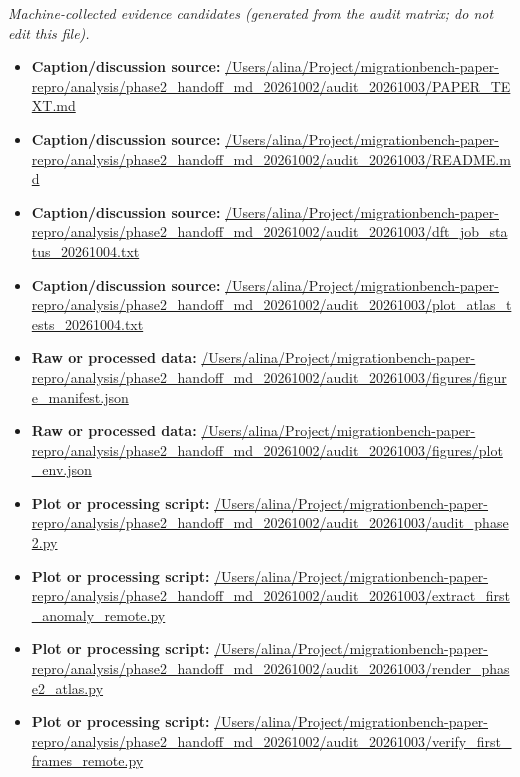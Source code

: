 \emph{Machine-collected evidence candidates (generated from the audit matrix; do not edit this file).}
\begin{itemize}[leftmargin=1.4em,noitemsep]
\item \textbf{Caption/discussion source:} \url{/Users/alina/Project/migrationbench-paper-repro/analysis/phase2_handoff_md_20261002/audit_20261003/PAPER_TEXT.md}
\item \textbf{Caption/discussion source:} \url{/Users/alina/Project/migrationbench-paper-repro/analysis/phase2_handoff_md_20261002/audit_20261003/README.md}
\item \textbf{Caption/discussion source:} \url{/Users/alina/Project/migrationbench-paper-repro/analysis/phase2_handoff_md_20261002/audit_20261003/dft_job_status_20261004.txt}
\item \textbf{Caption/discussion source:} \url{/Users/alina/Project/migrationbench-paper-repro/analysis/phase2_handoff_md_20261002/audit_20261003/plot_atlas_tests_20261004.txt}
\item \textbf{Raw or processed data:} \url{/Users/alina/Project/migrationbench-paper-repro/analysis/phase2_handoff_md_20261002/audit_20261003/figures/figure_manifest.json}
\item \textbf{Raw or processed data:} \url{/Users/alina/Project/migrationbench-paper-repro/analysis/phase2_handoff_md_20261002/audit_20261003/figures/plot_env.json}
\item \textbf{Plot or processing script:} \url{/Users/alina/Project/migrationbench-paper-repro/analysis/phase2_handoff_md_20261002/audit_20261003/audit_phase2.py}
\item \textbf{Plot or processing script:} \url{/Users/alina/Project/migrationbench-paper-repro/analysis/phase2_handoff_md_20261002/audit_20261003/extract_first_anomaly_remote.py}
\item \textbf{Plot or processing script:} \url{/Users/alina/Project/migrationbench-paper-repro/analysis/phase2_handoff_md_20261002/audit_20261003/render_phase2_atlas.py}
\item \textbf{Plot or processing script:} \url{/Users/alina/Project/migrationbench-paper-repro/analysis/phase2_handoff_md_20261002/audit_20261003/verify_first_frames_remote.py}
\end{itemize}
